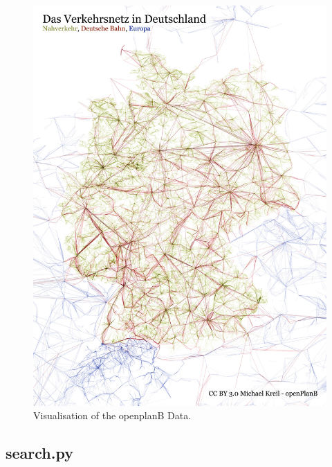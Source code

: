 \documentclass{scrartcl}
\begin{document}
\begin{figure}
\center
\includegraphics[width=16cm]{img/openDBviz.jpg}
\caption{Visualisation of the openplanB Data.}
\label{viz}
\end{figure}

\newpage
\begin{appendices} 

\section*{search.py}

\end{appendices}
\end{document}
